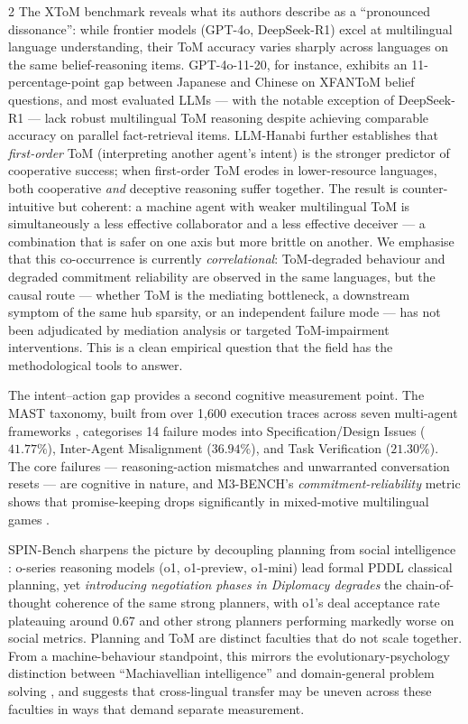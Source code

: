 \documentclass[openacc]{rsproca_new}
\begin{document}
\begin{multicols}{2}
The XToM benchmark \cite{chan2025xtom} reveals what its authors describe as a ``pronounced dissonance'': while frontier models (GPT-4o, DeepSeek-R1) excel at multilingual language understanding, their ToM accuracy varies sharply across languages on the same belief-reasoning items. GPT-4o-11-20, for instance, exhibits an 11-percentage-point gap between Japanese and Chinese on XFANToM belief questions, and most evaluated LLMs --- with the notable exception of DeepSeek-R1 --- lack robust multilingual ToM reasoning despite achieving comparable accuracy on parallel fact-retrieval items. LLM-Hanabi \cite{chen2025llmhanabi} further establishes that \emph{first-order} ToM (interpreting another agent's intent) is the stronger predictor of cooperative success; when first-order ToM erodes in lower-resource languages, both cooperative \emph{and} deceptive reasoning suffer together. The result is counter-intuitive but coherent: a machine agent with weaker multilingual ToM is simultaneously a less effective collaborator and a less effective deceiver --- a combination that is safer on one axis but more brittle on another. We emphasise that this co-occurrence is currently \emph{correlational}: ToM-degraded behaviour and degraded commitment reliability are observed in the same languages, but the causal route --- whether ToM is the mediating bottleneck, a downstream symptom of the same hub sparsity, or an independent failure mode --- has not been adjudicated by mediation analysis or targeted ToM-impairment interventions. This is a clean empirical question that the field has the methodological tools to answer.

The intent--action gap provides a second cognitive measurement point. The MAST taxonomy, built from over 1,600 execution traces across seven multi-agent frameworks \cite{cemri2025mast}, categorises 14 failure modes into Specification/Design Issues ($41.77\%$), Inter-Agent Misalignment ($36.94\%$), and Task Verification ($21.30\%$). The core failures --- reasoning-action mismatches and unwarranted conversation resets --- are cognitive in nature, and M3-BENCH's \emph{commitment-reliability} metric shows that promise-keeping drops significantly in mixed-motive multilingual games \cite{xie2026m3bench}.

SPIN-Bench sharpens the picture by decoupling planning from social intelligence \cite{yao2025spinbench}: o-series reasoning models (o1, o1-preview, o1-mini) lead formal PDDL classical planning, yet \emph{introducing negotiation phases in Diplomacy degrades} the chain-of-thought coherence of the same strong planners, with o1's deal acceptance rate plateauing around 0.67 and other strong planners performing markedly worse on social metrics. Planning and ToM are distinct faculties that do not scale together. From a machine-behaviour standpoint, this mirrors the evolutionary-psychology distinction between ``Machiavellian intelligence'' and domain-general problem solving \cite{byrne1988machiavellian}, and suggests that cross-lingual transfer may be uneven across these faculties in ways that demand separate measurement.


\end{multicols}
\end{document}
